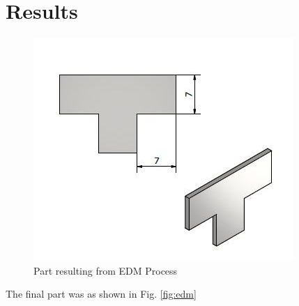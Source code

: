 \chapter{Results}
\begin{center}
	\begin{figure}[!h]
	\centering
	\includegraphics{Figures/edm cut}
	\caption[Final part]{Part resulting from EDM Process}
	\label{fig;edm}
	\end{figure}
\end{center}
The final part was as shown in Fig. \ref{fig:edm}
